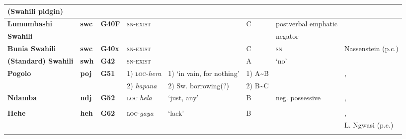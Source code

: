 \documentclass[output=paper]{langscibook}
\begin{document}
\begin{sidewaystable}[p]
\begin{scriptsize}
\begin{tabularx}{\textwidth}{llllllll}
\textbf{(Swahili pidgin)}\\\midrule
\textbf{Lumumbashi}&\textbf{swc}	&\textbf{G40F} 	&\textsc{sn-exist}&\textendash								&C 		& postverbal emphatic								&\citet{Schicho1992}\\
\textbf{Swahili}	&				&				&				&										&		&negator\\\midrule
\textbf{Bunia Swahili}&\textbf{swc}	&\textbf{G40x}	&\textsc{sn-exist}&\textendash								&C 		&\textsc{sn}										&Nassenstein (p.c.)\\\midrule
\textbf{(Standard) Swahili}&\textbf{swh}&\textbf{G42}&\textsc{sn-exist}&\textendash							&A{}	&`no' 											&\citet{Marten2013}\\\midrule
\textbf{Pogolo}	&\textbf{poj}	&\textbf{G51}	&1) \textsc{loc}-\textit{hera}&1) `in vain, for nothing'		&1) A{\textasciitilde}B&									&\citet{Nurse2007},\\
				&				&				&2) \textit{hapana}&2) Sw. borrowing(?)					&2) B{\textasciitilde}C&									&\citet{Hendle1907}\\\midrule
\textbf{Ndamba} &\textbf{ndj}		&\textbf{G52} 	&\textsc{loc} \textit{hela}&`just, any'						&B{}	&neg. possessive 									&\citet{Novotna2005},\\
				&				&				&				&										&		&												&\citet{EdelstenLijongwa2010}\\\midrule
\textbf{Hehe}	&\textbf{heh}	&\textbf{G62}	&\textsc{loc}-\textit{gaya}&`lack'							&B{}	&												&\citet{Velten1899},\\
				&				&				&				&										&		&												&L. Ngwasi (p.c.)\\
\lspbottomrule
\end{tabularx}\end{scriptsize}
\end{sidewaystable}
\end{document}
